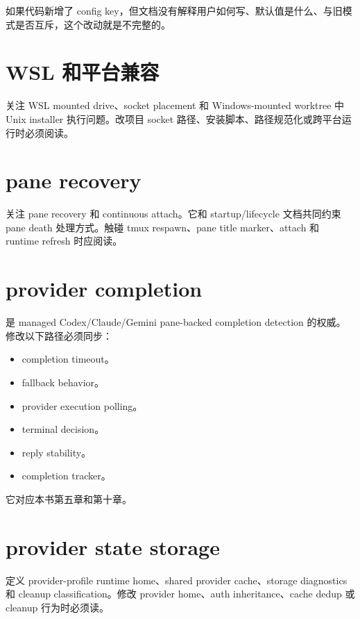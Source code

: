 如果代码新增了 config key，但文档没有解释用户如何写、默认值是什么、与旧模式是否互斥，这个改动就是不完整的。

\section{WSL 和平台兼容}

 关注 WSL mounted drive、socket placement 和 Windows-mounted worktree 中 Unix installer 执行问题。改项目 socket 路径、安装脚本、路径规范化或跨平台运行时必须阅读。

\section{pane recovery}

 关注 pane recovery 和 continuous attach。它和 startup/lifecycle 文档共同约束 pane death 处理方式。触碰 tmux respawn、pane title marker、attach 和 runtime refresh 时应阅读。

\section{provider completion}

 是 managed Codex/Claude/Gemini pane-backed completion detection 的权威。修改以下路径必须同步：

\begin{itemize}
  \item completion timeout。
  \item fallback behavior。
  \item provider execution polling。
  \item terminal decision。
  \item reply stability。
  \item completion tracker。
\end{itemize}

它对应本书第五章和第十章。

\section{provider state storage}

 定义 provider-profile runtime home、shared provider cache、storage diagnostics 和 cleanup classification。修改 provider home、auth inheritance、cache dedup 或 cleanup 行为时必须读。

